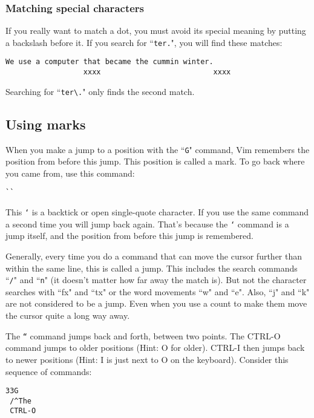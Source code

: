 \subsubsection{Matching special characters}

If you really want to match a dot, you must avoid its special meaning by putting a backslash before it.
If you search for ``\texttt{ter.}", you will find these matches:

		\begin{Verbatim}[samepage=true]
    We use a computer that became the cummin winter. 
                  xxxx                          xxxx
		\end{Verbatim}

		Searching for ``\texttt{ter\textbackslash{}.}" only finds the second match.

\subsection{Using marks}

When you make a jump to a position with the ``\texttt{G}" command, Vim remembers the position from before this jump.
This position is called a mark.
To go back where you came from, use this command:

 \begin{Verbatim}[samepage=true]
 ``
 \end{Verbatim}

This \texttt{`} is a backtick or open single-quote character.
If you use the same command a second time you will jump back again.
That's because the \texttt{`} command is a jump itself, and the position from before this jump is remembered.

Generally, every time you do a command that can move the cursor further than within the same line, this is called a jump.
This includes the search commands ``\texttt{/}" and ``\texttt{n}" (it doesn't matter how far away the match is).
But not the character searches with ``fx" and ``tx" or the word movements ``w" and ``e".
Also, ``j" and ``k" are not considered to be a jump.
Even when you use a count to make them move the cursor quite a long way away.
 
The \texttt{``} command jumps back and forth, between two points.
The CTRL-O command jumps to older positions (Hint: O for older).
CTRL-I then jumps back to newer positions (Hint: I is just next to O on the keyboard).
Consider this sequence of commands:

 \begin{Verbatim}[samepage=true]
 33G
 /^The
 CTRL-O
 \end{Verbatim}


